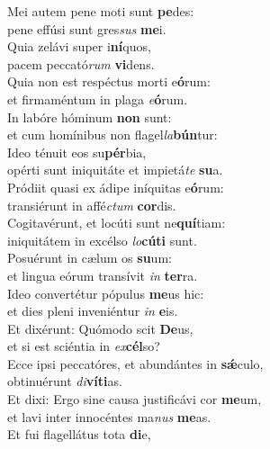 \evenverse Mei autem pene moti sunt \textbf{pe}des:~\*\\
\evenverse pene effúsi sunt gres\textit{sus} \textbf{me}i.\\
\oddverse Quia zelávi super i\textbf{ní}quos,~\*\\
\oddverse pacem peccató\textit{rum} \textbf{vi}dens.\\
\evenverse Quia non est respéctus morti e\textbf{ó}rum:~\*\\
\evenverse et firmaméntum in plaga \textit{e}\textbf{ó}rum.\\
\oddverse In labóre hóminum \textbf{non} sunt:~\*\\
\oddverse et cum homínibus non flagel\textit{la}\textbf{bún}tur:\\
\evenverse Ideo ténuit eos su\textbf{pér}bia,~\*\\
\evenverse opérti sunt iniquitáte et impietá\textit{te} \textbf{su}a.\\
\oddverse Pródiit quasi ex ádipe iníquitas e\textbf{ó}rum:~\*\\
\oddverse transiérunt in affé\textit{ctum} \textbf{cor}dis.\\
\evenverse Cogitavérunt, et locúti sunt ne\textbf{quí}tiam:~\*\\
\evenverse iniquitátem in excélso \textit{lo}\textbf{cú}\textbf{ti} sunt.\\
\oddverse Posuérunt in cælum os \textbf{su}um:~\*\\
\oddverse et lingua eórum transívit \textit{in} \textbf{ter}ra.\\
\evenverse Ideo convertétur pópulus \textbf{me}us hic:~\*\\
\evenverse et dies pleni inveniéntur \textit{in} \textbf{e}is.\\
\oddverse Et dixérunt: Quómodo scit \textbf{De}us,~\*\\
\oddverse et si est sciéntia in \textit{ex}\textbf{cél}so?\\
\evenverse Ecce ipsi peccatóres, et abundántes in \textbf{sǽ}culo,~\*\\
\evenverse obtinuérunt \textit{di}\textbf{ví}\textbf{ti}as.\\
\oddverse Et dixi: Ergo sine causa justificávi cor \textbf{me}um,~\*\\
\oddverse et lavi inter innocéntes ma\textit{nus} \textbf{me}as.\\
\evenverse Et fui flagellátus tota \textbf{di}e,~\*\\
